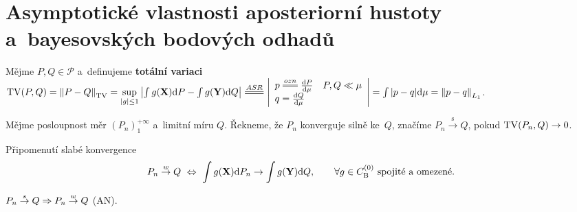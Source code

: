 \chapter{Asymptotické vlastnosti aposteriorní hustoty a~bayesovských bodových odhadů}

\begin{define}
	Mějme $P,Q\in\mathcal{P}$ a~definujeme \textbf{totální variaci} $\TV(P,Q)=\left\|P-Q\right\|_\TV=\sup\limits_{|g|\leq 1}\left| \int g(\X)\d P-\int g(\Y)\d Q \right|\equal{ASR}\left|\begin{array}{l}
	p\equal{ozn}\frac{\d P}{\d \mu}\quad P,Q\ll\mu\\ q=\frac{\d Q}{\d \mu}
	\end{array}
	\right|=\int |p-q|\d\mu=\left\|p-q\right\|_{L_1}$.
\end{define}
\begin{define}
	Mějme posloupnost měr $(P_n)_1^{+\infty}$ a~limitní míru $Q$. Řekneme, že $P_n$ konverguje silně ke~$Q$, značíme $P_n\stackrel{\text{s}}{\rightarrow}Q$, pokud $\mathrm{TV}(P_n,Q)\to0$.
\end{define}
\begin{remark}{Připomenutí slabé konvergence}
	$$ P_n\stackrel{w}{\to} Q~\Leftrightarrow~\int g(\textbf{X})\mathrm{d} P_n\to\int g(\textbf{Y})\mathrm{d} Q,\qquad \forall g\in C_\mathrm{B}^{(0)}\text{ spojité a~omezené.}$$
\end{remark}

\begin{theorem}
	$P_n\stackrel{s}{\to}Q\Rightarrow P_n\stackrel{w}{\to} Q$ (AN).
\end{theorem}

